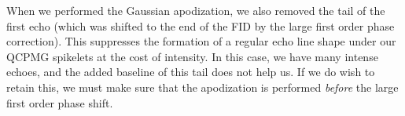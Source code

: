 \documentclass[11pt,a4paper]{article}
\begin{document}
When we performed the Gaussian apodization, we also removed the tail of the first echo (which was
shifted to the end of the FID by the large first order phase correction). This suppresses the
formation of a regular echo line shape under our QCPMG spikelets at the cost of intensity. In this
case, we have many intense echoes, and the added baseline of this tail does not help us. If we do
wish to retain this, we must make sure that the apodization is performed \textit{before} the large
first order phase shift.
\end{document}
